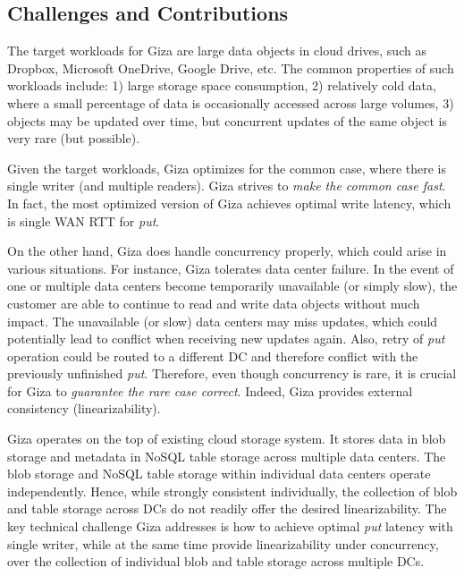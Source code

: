 \subsection{Challenges and Contributions}

The target workloads for Giza are large data objects in cloud drives, such as Dropbox, Microsoft OneDrive, Google Drive, etc. The common properties of such workloads include: 1) large storage space consumption, 2) relatively cold data, where a small percentage of data is occasionally accessed across large volumes, 3) objects may be updated over time, but concurrent updates of the same object is very rare (but possible).

Given the target workloads, Giza optimizes for the common case, where there is single writer (and multiple readers). Giza strives to {\em make the common case fast}. In fact, the most optimized version of Giza achieves optimal write latency, which is single WAN RTT for {\em put}.

On the other hand, Giza does handle concurrency properly, which could arise in various situations. For instance, Giza tolerates data center failure. In the event of one or multiple data centers become temporarily unavailable (or simply slow), the customer are able to continue to read and write data objects without much impact. The unavailable (or slow) data centers may miss updates, which could potentially lead to conflict when receiving new updates again. Also, retry of {\em put} operation could be routed to a different DC and therefore conflict with the previously unfinished {\em put}. Therefore, even though concurrency is rare, it is crucial for Giza to {\em guarantee the rare case correct}. Indeed, Giza provides external consistency (linearizability).

Giza operates on the top of existing cloud storage system. It stores data in blob storage and metadata in NoSQL table storage across multiple data centers. The blob storage and NoSQL table storage within individual data centers operate independently. Hence, while strongly consistent individually, the collection of blob and table storage across DCs do not readily offer the desired linearizability. The key technical challenge Giza addresses is how to achieve optimal {\em put} latency with single writer, while at the same time provide linearizability under concurrency, over the collection of individual blob and table storage across multiple DCs.

